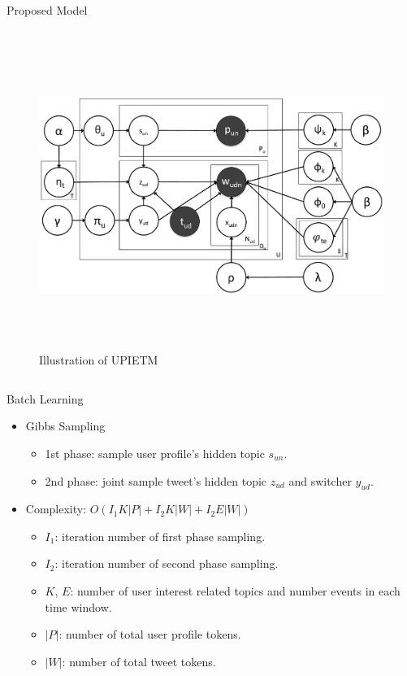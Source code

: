 \documentclass{beamer}
\begin{document}
\begin{frame}
\begin{columns}[T]
\begin{column}{.46\textwidth}
{\begin{block}{Proposed Model}
\begin{columns}
\begin{column}{.5\textwidth}
\begin{figure}
                        \includegraphics[height=10cm]{img/timeUserTagLDAIV.pdf}
                        \caption{Illustration of UPIETM}
                        \label{fig:Illustration of UPIETM}
                \end{figure} 
        \end{column}
\end{columns}

\end{block}

\begin{block}{Batch Learning}
\begin{itemize}
\item Gibbs Sampling
	\begin{itemize}
	\item 1st phase: sample user profile's hidden topic \(s_{un}\).
	\item 2nd phase: joint sample tweet's hidden topic \(z_{ud}\) and switcher \(y_{ud}\).
	\end{itemize}
\item Complexity: \(O(I_1 K|P|+I_2 K|W|+I_2 E|W|)\)
	\begin{itemize}
	\item \scriptsize{\(I_1\): iteration number of first phase sampling.}
	\item \scriptsize{\(I_2\): iteration number of second phase sampling.}
	\item \scriptsize{\(K\), \(E\): number of user interest related topics and number events in each time window.}
	\item \scriptsize{\(|P|\):  number of total user profile tokens.}
	\item \scriptsize{\(|W|\): number of total tweet tokens.}
	\end{itemize}
\end{itemize}
\end{block}
}
\end{column}


\end{columns}
\end{frame}
\end{document}

